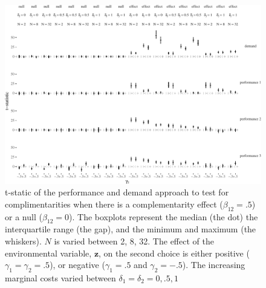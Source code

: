 \documentclass[12pt]{article}
\begin{document}
\begin{figure}

\includegraphics[width=500px]{figure-latex/unnamed-chunk-9-1}
\caption[The Error Rate and Power with Different Levels of Marginal Costs]
{\label{delta} t-static of the performance and demand approach to test
for complimentarities when there is a complementarity effect ($\beta_{12} = .5$)
or a null ($\beta_{12} = 0$). The boxplots represent the median (the dot) the
interquartile range (the gap), and the minimum and maximum (the whiskers). $N$
is varied between 2, 8, 32. The effect of the environmental
variable, $\mathbf{z}$, on the second choice is either positive
($\gamma_1 = \gamma_2 = .5$), or negative ($\gamma_1 = .5$ and $\gamma_2 = -.5$).
The increasing marginal costs varied between $\delta_1 = \delta_2 = 0, .5, 1$}
\end{figure}
\end{document}
